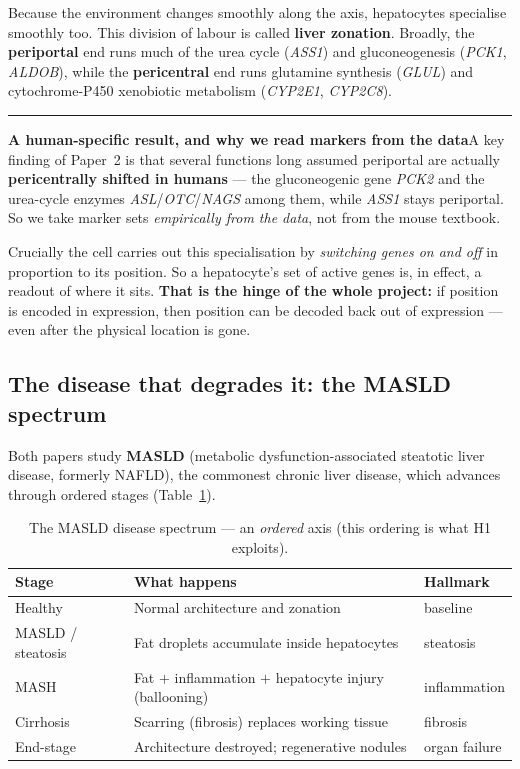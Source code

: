 \documentclass[11pt]{article}
\newcommand{\aside}[2]{\par\medskip\noindent\textcolor{teal0}{\rule{2pt}{\baselineskip}}\quad\textbf{\textcolor{teal0}{#1}}\quad #2\par\medskip}
\newcommand{\gene}[1]{\textit{#1}}
\begin{document}
Because the environment changes smoothly along the axis, hepatocytes specialise smoothly too. This
division of labour is called \textbf{liver zonation}. Broadly, the \textbf{periportal} end runs much
of the urea cycle (\gene{ASS1}) and gluconeogenesis (\gene{PCK1}, \gene{ALDOB}), while the
\textbf{pericentral} end runs glutamine synthesis (\gene{GLUL}) and cytochrome-P450 xenobiotic
metabolism (\gene{CYP2E1}, \gene{CYP2C8}).

\aside{A human-specific result, and why we read markers from the data}{A key finding of Paper~2 is
that several functions long assumed periportal are actually \textbf{pericentrally shifted in humans}
--- the gluconeogenic gene \gene{PCK2} and the urea-cycle enzymes \gene{ASL}/\gene{OTC}/\gene{NAGS}
among them, while \gene{ASS1} stays periportal. So we take marker sets \emph{empirically from the
data}, not from the mouse textbook.}

Crucially the cell carries out this specialisation by \emph{switching genes on and off} in proportion
to its position. So a hepatocyte's set of active genes is, in effect, a readout of where it sits.
\textbf{That is the hinge of the whole project:} if position is encoded in expression, then position
can be decoded back out of expression --- even after the physical location is gone.

\subsection{The disease that degrades it: the MASLD spectrum}
\label{sec:masld}

Both papers study \textbf{MASLD} (metabolic dysfunction-associated steatotic liver disease, formerly
NAFLD), the commonest chronic liver disease, which advances through ordered stages
(Table~\ref{tab:stages}).

\begin{table}[h]
\centering\small
\caption{The MASLD disease spectrum --- an \emph{ordered} axis (this ordering is what H1 exploits).}
\label{tab:stages}
\begin{tabular}{@{}lll@{}}
\toprule
\textbf{Stage} & \textbf{What happens} & \textbf{Hallmark}\\
\midrule
Healthy & Normal architecture and zonation & baseline\\
MASLD / steatosis & Fat droplets accumulate inside hepatocytes & steatosis\\
MASH & Fat $+$ inflammation $+$ hepatocyte injury (ballooning) & inflammation\\
Cirrhosis & Scarring (fibrosis) replaces working tissue & fibrosis\\
End-stage & Architecture destroyed; regenerative nodules & organ failure\\
\bottomrule
\end{tabular}
\end{table}
\end{document}

